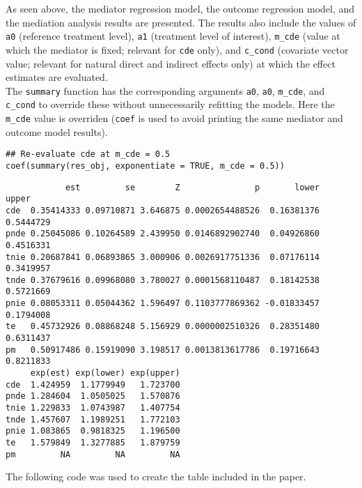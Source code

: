 \documentclass[10pt]{article}
\begin{document}
\normalsize

As seen above, the mediator regression model, the outcome regression model, and the mediation analysis results are presented. The results also include the values of \texttt{a0} (reference treatment level), \texttt{a1} (treatment level of interest), \texttt{m\_cde} (value at which the mediator is fixed; relevant for \texttt{cde} only), and \texttt{c\_cond} (covariate vector value; relevant for natural direct and indirect effects only) at which the effect estimates are evaluated.\\

The \texttt{summary} function has the corresponding arguments \texttt{a0}, \texttt{a0}, \texttt{m\_cde}, and \texttt{c\_cond} to override these without unnecessarily refitting the models. Here the \texttt{m\_cde} value is overriden (\texttt{coef} is used to avoid printing the same mediator and outcome model results).

\scriptsize
\begin{verbatim}
## Re-evaluate cde at m_cde = 0.5
coef(summary(res_obj, exponentiate = TRUE, m_cde = 0.5))
\end{verbatim}

\begin{verbatim}
            est         se        Z               p       lower     upper
cde  0.35414333 0.09710871 3.646875 0.0002654488526  0.16381376 0.5444729
pnde 0.25045086 0.10264589 2.439950 0.0146892902740  0.04926860 0.4516331
tnie 0.20687841 0.06893865 3.000906 0.0026917751336  0.07176114 0.3419957
tnde 0.37679616 0.09968080 3.780027 0.0001568110487  0.18142538 0.5721669
pnie 0.08053311 0.05044362 1.596497 0.1103777869362 -0.01833457 0.1794008
te   0.45732926 0.08868248 5.156929 0.0000002510326  0.28351480 0.6311437
pm   0.50917486 0.15919090 3.198517 0.0013813617786  0.19716643 0.8211833
     exp(est) exp(lower) exp(upper)
cde  1.424959  1.1779949   1.723700
pnde 1.284604  1.0505025   1.570876
tnie 1.229833  1.0743987   1.407754
tnde 1.457607  1.1989251   1.772103
pnie 1.083865  0.9818325   1.196500
te   1.579849  1.3277885   1.879759
pm         NA         NA         NA
\end{verbatim}

\normalsize

The following code was used to create the table included in the paper.
\end{document}
